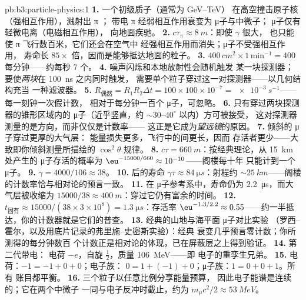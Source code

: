 \begin{solution}{pb:b3:particle-physics:1}
\textbf{1.} 一个初级质子（通常为 \unit{GeV}--\unit{TeV}）
在高空撞击原子核（强相互作用），溅射出 π ；
带电 π 经弱相互作用衰变为 μ子与中微子；
μ子仅有轻微电离（电磁相互作用），
向地面疾驰。
\textbf{2.} $c\tau_\pi \approx \qty{8}{m}$：即使 $\gamma$ 很大，
也只能使 π 飞行数百米，它们还会在空气中
经强相互作用而消失；μ子不受强相互作用，
寿命长 $85\times$ 倍，因而是能够抵达地面的粒子。
\textbf{3.} $400\,\unit{cm^2}\times1\,\text{min}^{-1} = 400$
每分钟——约每秒 7 个。
\textbf{4.} 噪声闪烁和本地放射性会随机触发
某一块探测器；要使\emph{两块}在 \qty{100}{ns} 之内同时触发，
需要单个粒子穿过这一对探测器——以几何结构充当
一种滤波器。
\textbf{5.} $R_{\text{偶然}} = R_1R_2\Delta t = 100\times100
\times10^{-7} = \qty{e-3}{s^{-1}}$——每一刻钟一次假计数，
相对于每分钟一百个 μ子，可忽略。
\textbf{6.} 只有穿过两块探测器的锥形区域内的
μ子（近乎竖直，约 ${\sim}30$--$40^\circ$ 以内）方可被接受，
这对探测器测量的是方向，而非仅仅是计数率——
这正是它成为\emph{望远镜}的原因。
\textbf{7.} 倾斜的 μ子穿过更厚的大气层：
能量损失更多，飞行中的间更长，因而
存活者更少——大致即你倾斜测量所描绘的 $\cos^2\theta$ 规律。
\textbf{8.} $c\tau = \qty{660}{m}$：按经典理论，从
\qty{15}{km} 处产生的 μ子存活的概率为
$\eu^{-15000/660} \approx 10^{-10}$——阁楼每十年
只能计到一个 μ子。
\textbf{9.} $\gamma = 4000/106 \approx 38$。
\textbf{10.} 后的寿命 $\gamma\tau \approx
\qty{84}{\micro s}$：射程约 ${\sim}\qty{25}{km}$——阁楼
的计数率恰与相对论的预言一致。
\textbf{11.} 在 μ子参考系中，寿命仍为
\qty{2.2}{\micro s}，而大气层被收缩为
$15000/38 \approx \qty{400}{m}$：穿过它仍有富余的时间。
\textbf{12.} $t_{\text{固有}} \approx 15000/(38\times3\times
10^8) = \qty{1.3}{\micro s}$：存活率 $\eu^{-1.3/2.2} \approx
0.55$——约一半抵达，你的计数器就是它们的普查。
\textbf{13.} 经典的山地与海平面 μ子对比实验
（罗西–霍尔，以及用底片记录的弗里施–史密斯实验）：经典
衰变几乎预言零计数；你所测得的每分钟数百
个计数正是相对论的体现，已在屏蔽层之上得到验证。
\textbf{14.} 第二代带电：
电荷 $-e$，自旋 $\tfrac12$，质量 \qty{106}{MeV}——即
电子的重孪生兄弟。
\textbf{15.} 电荷：$-1 = -1 + 0 + 0$；电子族：
$0 = 1 + (-1) + 0$；μ子族：$1 = 0 + 0 + 1$。所有
账目都平衡。
\textbf{16.} 三个粒子以任意比例分享能量预算，
因此电子能谱是连续的；它在两个中微子
一同与电子反冲时截止，约为
$m_\mu c^2/2 \approx \qty{53}{MeV}$。

\end{solution}
